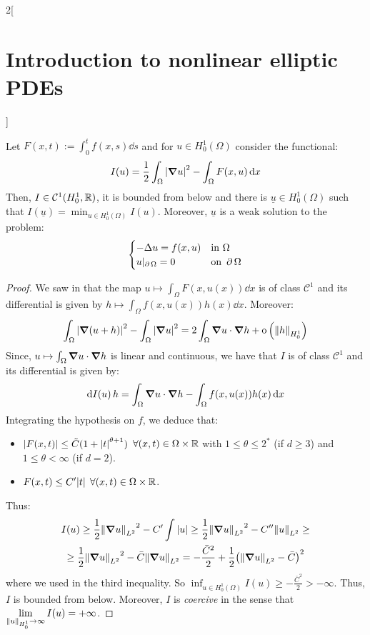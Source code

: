 \documentclass[../../../main_math.tex]{subfiles}
\begin{document}
\begin{multicols}{2}[\section{Introduction to nonlinear elliptic PDEs}]
\begin{theorem}
    Let $F(x,t):=\int_0^tf(x,s)\dd{s}$ and for $u\in H_0^1(\Omega)$ consider the functional:
    $$
      I(u)=\frac{1}{2}\int_\Omega \abs{\grad u}^2-\int_\Omega F(x,u)\dd{x}
    $$
    Then, $I\in\mathcal{C}^1(H_0^1,\mathbb{R})$, it is bounded from below and there is $\underline{u}\in H_0^1(\Omega)$ such that $\displaystyle I(\underline{u})=\min_{u\in H_0^1(\Omega)}I(u)$. Moreover, $\underline{u}$ is a weak solution to the problem:
    \begin{equation}
      \label{INEPDE:eq_problem_min}
      \begin{cases}
        -\Delta u=f(x,u) & \text{in }\Omega      \\
        u|_{\operatorname{\partial}{\Omega}}=0   & \text{on }\operatorname{\partial}{\Omega}
      \end{cases}
    \end{equation}
  \end{theorem}
  \begin{proof}
    We saw in  that the map $u\mapsto \int_\Omega F(x,u(x))\dd{x}$ is of class $\mathcal{C}^1$ and its differential is given by $h\mapsto \int_\Omega f(x,u(x))h(x)\dd{x}$. Moreover:
    $$
      \int_\Omega\abs{\grad(u+h)}^2-\int_\Omega\abs{\grad u}^2=2\int_\Omega \grad u\cdot \grad h+\mathrm{o}\left(\left\|h\right\|_{H_0^1}\right)
    $$
    Since, $u\mapsto \int_\Omega \grad u\cdot \grad h$ is linear and continuous, we have that $I$ is of class $\mathcal{C}^1$ and its differential is given by:
    $$
      \dd{I(u)}h=\int_\Omega \grad u\cdot \grad h-\int_\Omega f(x,u(x))h(x)\dd{x}
    $$
    Integrating the hypothesis on $f$, we deduce that:
    \begin{itemize}
      \item $\abs{F(x,t)}\leq \tilde{C} (1+\abs{t}^{\theta+1})$ $\forall (x,t)\in \Omega\times \mathbb{R}$ with $1\leq \theta\leq 2^*$ (if $d\geq 3$) and $1\leq \theta<\infty$ (if $d=2$).
      \item $F(x,t)\leq C'\abs{t}$ $\forall (x,t)\in \Omega\times \mathbb{R}$.
    \end{itemize}
    Thus:
    \begin{multline*}
      I(u)\geq \frac{1}{2}{\left\|\grad u\right\|_{L^2}}^2-C'\int \abs{u}\geq \frac{1}{2}{\left\|\grad u\right\|_{L^2}}^2-C''{\left\|u\right\|_{L^2}}\geq \\\geq \frac{1}{2} {\left\|\grad u\right\|_{L^2}}^2-\bar{C}{\left\|\grad u\right\|_{L^2}}
      =-\frac{\bar{C}^2}{2}+\frac{1}{2}{\left(\left\|\grad u\right\|_{L^2}-\bar{C}\right)}^2
    \end{multline*}
    where we used  in the third inequality. So $\displaystyle \inf_{u\in H_0^1(\Omega)}I(u)\geq -\frac{\bar{C}^2}{2}>-\infty$. Thus, $I$ is bounded from below. Moreover, $I$ is \emph{coercive} in the sense that $\displaystyle \lim_{\left\|u\right\|_{H_0^1}\to\infty}I(u)=+\infty$.


\end{proof}
\end{multicols}
\end{document}
